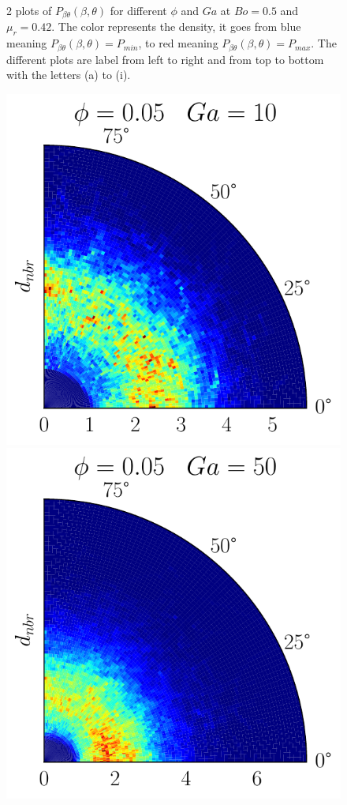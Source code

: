 \begin{figure}[h!]
    \caption{2 plots of $P_{\beta\theta}(\beta,\theta)$ for different $\phi$ and $Ga$ at $Bo = 0.5$ and $\mu_r = 0.42$. The color represents the density, it goes from blue meaning $P_{\beta\theta}(\beta,\theta)= P_{min}$, to red meaning $P_{\beta\theta}(\beta,\theta) = P_{max}$. The different plots are label from left to right and from top to bottom with the letters (a) to (i).} 
\end{figure} 
\begin{figure}[h!]
    \centering
    \includegraphics[height =\size]{image/N_10/beta/2DMAP_theta_distmin_dmin_10_Bo1PHI0_05mu_r0_42Ga10.pdf}
    \includegraphics[height =\size]{image/N_10/beta/2DMAP_theta_distmin_dmin_10_Bo1PHI0_05mu_r0_42Ga50.pdf}

\end{figure}
